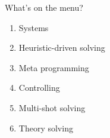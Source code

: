 \begin{frame}{What's on the menu?}
  \bigskip\bigskip
    \begin{enumerate}%
    \item Systems
      \smallskip
    \item Heuristic-driven solving
      \smallskip
    \item Meta programming
      \smallskip
    \item Controlling
      \smallskip
    \item Multi-shot solving
      \smallskip
    \item Theory solving
    \end{enumerate}
\end{frame}
%
